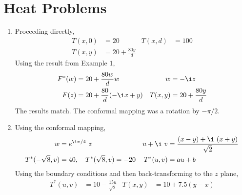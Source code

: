 \section{Heat Problems}

\begin{enumerate}
    \item Proceeding directly,
          \begin{align}
              T(x, 0) & = 20                 & T(x, d) & = 100 \\
              T(x, y) & = 20 + \frac{80y}{d}
          \end{align}
          Using the result from Example $ 1 $,
          \begin{align}
              F^*(w)  & = 20 + \frac{80w}{d} w         &
              w       & = -\i z                          \\
              F(z)    & = 20 + \frac{80}{d}(-\i x + y) &
              T(x, y) & = 20 + \frac{80y}{d}
          \end{align}
          The results match. The conformal mapping was a rotation by $ -\pi/2 $.

    \item Using the conformal mapping,
          \begin{align}
              w                 & = e^{\i \pi/4}\ z                      &
              u + \i\ v         & = \frac{(x-y) + \i\ (x + y)}{\sqrt{2}}   \\
              T^*(-\sqrt{8}, v) & = 40, \quad T^*(\sqrt{8}, v) = -20     &
              T^*(u, v)         & = au + b
          \end{align}
          Using the boundary conditions and then back-transforming to the $ z $ plane,
          \begin{align}
              T^*(u, v) & = 10 - \frac{15u}{\sqrt{2}} &
              T(x, y)   & = 10 + 7.5(y-x)
          \end{align}


\end{enumerate}
